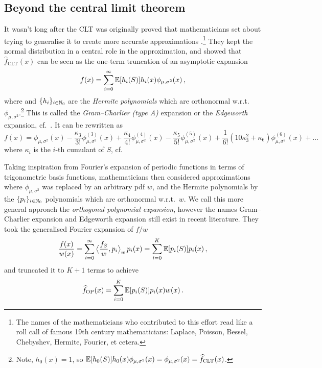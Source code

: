 \subsection{Beyond the central limit theorem}

It wasn't long after the CLT was originally proved that mathematicians set about trying to generalise it to create more accurate approximations \cite{hald2000early}.\footnote{The names of the mathematicians who contributed to this effort read like a roll call of famous 19th century mathematicians: Laplace, Poisson, Bessel, Chebyshev, Hermite, Fourier, et cetera.} They  kept the normal distribution in a central role in the approximation, and showed that $\hat{f}_{\mathrm{CLT}}(x)$ can be seen as the one-term truncation of an asymptotic expansion
\[ f(x) = \sum_{i=0}^\infty \operatorname{{\mathbb E}}[ h_i(S) ] h_i(x) \phi_{\mu,\sigma^2}(x) \,, \]
where and $\{ h_i \}_{i\in\mathbb{N}_0}$ are the \emph{Hermite polynomials} which are orthonormal w.r.t.\ $\phi_{\mu,\sigma^2}$.\footnote{Note, $h_0(x) = 1$, so $\operatorname{{\mathbb E}}[ h_0(S) ] h_0(x) \phi_{\mu,\sigma^2}(x) = \phi_{\mu,\sigma^2}(x) = \widehat{f}_{\mathrm{CLT}}(x)$.} This is called the \emph{Gram--Charlier (type A)} expansion or the \emph{Edgeworth} expansion, cf.\ \cite{barndorff1989asymptotic,kolassa2006series}. It can be rewritten as
\[ f(x) = \phi_{\mu,\sigma^2}(x) - \frac{\kappa_3}{3!} \phi_{\mu,\sigma^2}^{(3)}(x) + \frac{\kappa_4}{4!} \phi_{\mu,\sigma^2}^{(4)}(x) - \frac{\kappa_5}{5!} \phi_{\mu,\sigma^2}^{(5)}(x) + \frac{1}{6!}( 10 \kappa_3^2 + \kappa_6 ) \phi_{\mu,\sigma^2}^{(6)}(x) + \dots  \]
where $\kappa_i$ is the $i$-th cumulant of $S$, cf.\ \cite{berberan2007expressing,cohen2011generalization}

Taking inspiration from Fourier's expansion of periodic functions in terms of trigonometric basis functions, mathematicians then considered approximations where $\phi_{\mu,\sigma^2}$ was replaced by an arbitrary pdf $w$, and the Hermite polynomials by the $\{ p_i \}_{i\in\mathbb{N}_0}$ polynomials which are orthonormal w.r.t.\ $w$. We call this more general approach the \emph{orthogonal polynomial expansion}, however the names Gram--Charlier expansion and Edgeworth expansion still exist in recent literature. They took the generalised Fourier expansion of $f/w$
\[ \frac{f(x)}{w(x)} = \sum_{i=0}^\infty \big\langle \frac{f_S}{w}, p_i \big\rangle_w \, p_i(x) = \sum_{i=0}^K \operatorname{{\mathbb E}}[ p_i(S) ] p_i(x) \,, \]
and truncated it to $K+1$ terms to achieve
\[ \widehat{f}_{\mathrm{OP}}(x) = \sum_{i=0}^K \operatorname{{\mathbb E}}[ p_i(S) ] p_i(x) w(x) \,. \]

